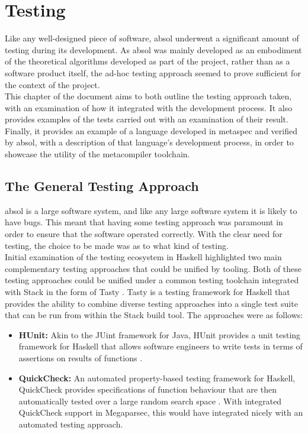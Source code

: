\chapter{Testing} %
\label{cha:testing}
Like any well-designed piece of software, \gls{absol} underwent a significant amount of testing during its development.
As \gls{absol} was mainly developed as an embodiment of the theoretical algorithms developed as part of the project, rather than as a software product itself, the ad-hoc testing approach seemed to prove sufficient for the context of the project.\\

This chapter of the document aims to both outline the testing approach taken, with an examination of how it integrated with the development process.
It also provides examples of the tests carried out with an examination of their result. 
Finally, it provides an example of a language developed in \gls{metaspec} and verified by \gls{absol}, with a description of that language's development process, in order to showcase the utility of the metacompiler toolchain.

\section{The General Testing Approach} %
\label{sec:the_general_testing_approach}
\gls{absol} is a large software system, and like any large software system it is likely to have bugs.
This meant that having some testing approach was paramount in order to ensure that the software operated correctly.
With the clear need for testing, the choice to be made was as to what kind of testing.\\

Initial examination of the testing ecosystem in Haskell highlighted two main complementary testing approaches that could be unified by tooling.
Both of these testing approaches could be unified under a common testing toolchain integrated with Stack in the form of Tasty \citep{tasty_haskell}. 
Tasty is a testing framework for Haskell that provides the ability to combine diverse testing approaches into a single test suite that can be run from within the Stack build tool. 
The approaches were as follows:
\begin{itemize}
    \item \textbf{HUnit:} Akin to the JUint framework for Java, HUnit provides a unit testing framework for Haskell that allows software engineers to write tests in terms of assertions on results of functions \citep{hunit}.
    \item \textbf{QuickCheck:} An automated property-based testing framework for Haskell, QuickCheck provides specifications of function behaviour that are then automatically tested over a large random search space \citep{quick_check}.
    With integrated QuickCheck support in Megaparsec, this would have integrated nicely with an automated testing approach.
\end{itemize}

